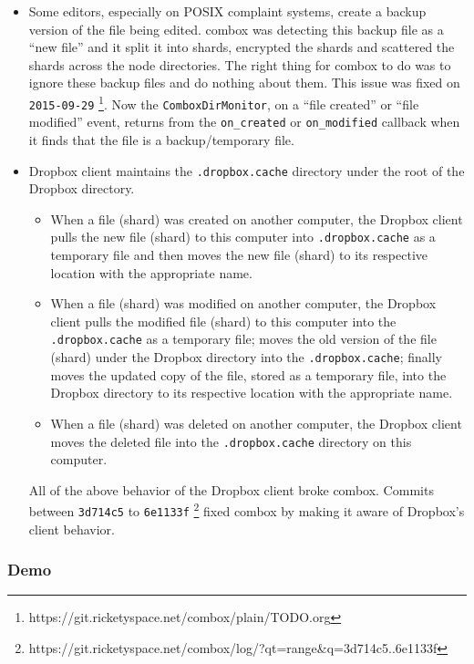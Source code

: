 \begin{itemize}
\item Some editors, especially on POSIX complaint systems, create a
  backup version of the file being edited. combox was detecting this
  backup file as a ``new file'' and it split it into shards, encrypted
  the shards and scattered the shards across the node directories. The
  right thing for combox to do was to ignore these backup files and do
  nothing about them. This issue was fixed on \verb+2015-09-29+
  \footnote{https://git.ricketyspace.net/combox/plain/TODO.org}. Now
  the \verb+ComboxDirMonitor+, on a ``file created'' or ``file
  modified'' event, returns from the \verb+on_created+ or
  \verb+on_modified+ callback when it finds that the file is a
  backup/temporary file.
\item Dropbox client maintains the \verb+.dropbox.cache+ directory
  under the root of the Dropbox directory.

  \begin{itemize}
  \item When a file (shard) was created on another computer, the
    Dropbox client pulls the new file (shard) to this computer into
    \verb+.dropbox.cache+ as a temporary file and then moves the new
    file (shard) to its respective location with the appropriate name.
  \item When a file (shard) was modified on another computer, the
    Dropbox client pulls the modified file (shard) to this computer
    into the \verb+.dropbox.cache+ as a temporary file; moves the old
    version of the file (shard) under the Dropbox directory into the
    \verb+.dropbox.cache+; finally moves the updated copy of the file,
    stored as a temporary file, into the Dropbox directory to its
    respective location with the appropriate name.
  \item When a file (shard) was deleted on another computer, the
    Dropbox client moves the deleted file into the
    \verb+.dropbox.cache+ directory on this computer.
  \end{itemize}

  All of the above behavior of the Dropbox client broke
  combox. Commits between \verb+3d714c5+ to \verb+6e1133f+
  \footnote{https://git.ricketyspace.net/combox/log/?qt=range\&q=3d714c5..6e1133f}
  fixed combox by making it aware of Dropbox's client behavior.
\end{itemize}

\subsubsection{Demo}

